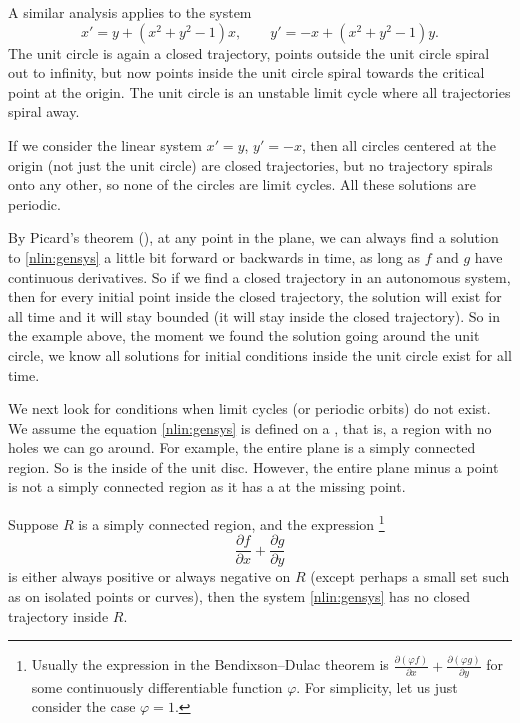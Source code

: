 A similar analysis applies to the system
\begin{equation*}
x' = y + {(x^2+y^2-1)} x, \qquad
y' = -x + {(x^2+y^2-1)} y.
\end{equation*}
The unit circle is again a closed trajectory,
points outside the unit circle spiral out to infinity, but now points
inside the unit circle spiral towards the critical point at the origin.
The unit circle is an unstable limit cycle where
all trajectories spiral away.

If we consider the linear system $x' = y$, $y' = -x$, then all circles centered
at the origin (not just the unit circle) are closed trajectories,
but no trajectory spirals onto any
other, so none of the circles are limit cycles.
All these solutions are periodic.

By Picard's theorem (), at any point
in the plane, we can always find a solution to
\eqref{nlin:gensys} a little bit
forward or backwards in time,
as long as $f$ and $g$ have continuous derivatives.  So 
if we find a closed trajectory in an autonomous system,
then for every initial point inside
the closed trajectory, the solution will exist for all time and it will stay
bounded (it will stay inside the closed trajectory).
So in the example above,
the moment we found
the solution going around the unit circle,
we know all solutions for initial conditions
inside the unit circle exist for all time.

\medskip

We next look for conditions when limit cycles (or periodic orbits) do not exist.
We assume
the equation \eqref{nlin:gensys} is defined on a
\emph{}, that is, a region with no holes
we can go around.  For example, the entire plane is a simply
connected region.  So is the inside of the unit disc.  However,
the entire plane minus a point is not a simply connected region as it has a
 at the missing point.

\begin{theorem}%
Suppose $R$ is a simply connected region,
and the expression%
\footnote{Usually the expression in the Bendixson--Dulac theorem is
$\frac{\partial (\varphi f)}{\partial x} + \frac{\partial (\varphi
g)}{\partial y}$
for some continuously differentiable function $\varphi$.  For simplicity,
let us just consider the case $\varphi = 1$.}
\begin{equation*}
\frac{\partial f}{\partial x} + \frac{\partial g}{\partial y}
\end{equation*}
is either always positive or always negative
on $R$ (except perhaps a small set such as on isolated points or curves),
then the system \eqref{nlin:gensys}
has no closed trajectory inside $R$.
\end{theorem}

